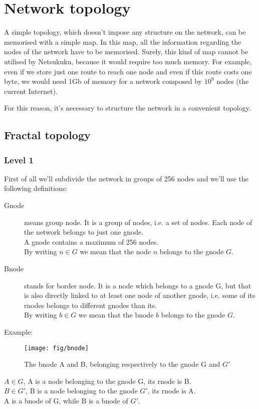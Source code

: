 \documentclass[a4paper]{article}
\begin{document}
\section{Network topology}
\label{sec:net_topology}

A simple topology, which doesn't impose any structure on the network, can be
memorised with a simple map. In this map, all the information regarding the
nodes of the network have to be memorised. Surely, this kind of map cannot be
utilised by Netsukuku, because it would require too much memory.
For example, even if we store just one route to reach one node and even if
this route costs one byte, we would need 1Gb of memory for a network composed
by $10^9$ nodes (the current Internet).

For this reason, it's necessary to structure the network in a convenient
topology.

\subsection{Fractal topology}
\label{sec:fractal_topology}
\subsubsection{Level 1}
First of all we'll subdivide the network in groups of 256 nodes and we'll use
the following definitions:
\begin{description}
	\item[Gnode] means group node. It is a group of nodes, i.e. a set of
		nodes. Each node of the network belongs to just one gnode.\\
		A gnode contains a maximum of 256 nodes.\\
		By writing $n \in G$ we mean that the node $n$ belongs to the
		gnode $G$.
	\item[Bnode] stands for border node. It is a node which belongs to a
		gnode G, but that is also directly linked to at least one node
		of another gnode, i.e. some of its rnodes belongs to different
		gnodes than its.\\
		By writing $b \in G$ we mean that the bnode $b$ belongs to the
		gnode $G$.
\end{description}

Example:\\
\begin{figure}[h]
	\begin{center}
		\texttt{[image: fig/bnode]}
	\end{center}
	\caption{The bnode A and B, belonging respectively to the gnode G and
	$G'$}
\end{figure}
$A \in G $, A is a node belonging to the gnode G, its rnode is B.\\
$B \in G'$, B is a node belonging to the gnode $G'$, its rnode is A.\\
A is a bnode of G, while B is a bnode of $G'$.
\end{document}
